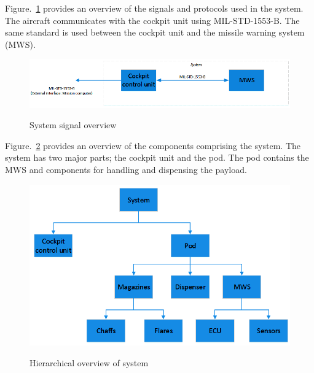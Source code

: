 Figure.~\ref{fig:sigOverview} provides an overview of the signals and protocols used in the system. 
The aircraft communicates with the cockpit unit using MIL-STD-1553-B. 
The same standard is used between the cockpit unit and the missile warning system (MWS).

\begin{figure}[h]
	\centering
	\includegraphics[scale=0.55]{./images/signalOverview.png}\\
	\caption{System signal overview}
    \label{fig:sigOverview}
\end{figure}

Figure.~\ref{fig:hieraOverview} provides an overview of the components comprising the system.
The system has two major parts; the cockpit unit and the pod. 
The pod contains the MWS and components for handling and dispensing the payload.

\begin{figure}[h]
	\centering
	\includegraphics[scale=0.6]{./images/hierarchical.png}\\
	\caption{Hierarchical overview of system}
    \label{fig:hieraOverview}
\end{figure}

